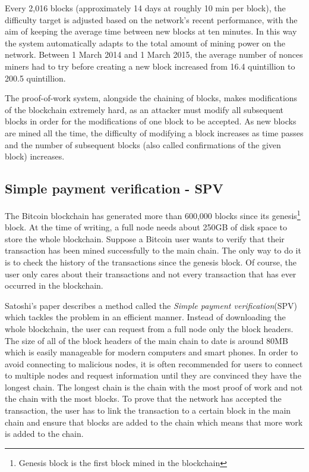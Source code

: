 Every 2,016 blocks (approximately 14 days at roughly 10 min per block), the
difficulty target is adjusted based on the network's recent performance, with
the aim of keeping the average time between new blocks at ten minutes. In this
way the system automatically adapts to the total amount of mining power on the
network. Between 1 March 2014 and 1 March 2015, the average number of
nonces miners had to try before creating a new block increased from 16.4
quintillion to 200.5 quintillion.

The proof-of-work system, alongside the chaining of blocks, makes modifications
of the blockchain extremely hard, as an attacker must modify all subsequent
blocks in order for the modifications of one block to be accepted. As new
blocks are mined all the time, the difficulty of modifying a block increases as
time passes and the number of subsequent blocks (also called confirmations of
the given block) increases.

\subsection{Simple payment verification - SPV}

The Bitcoin blockchain has generated more than 600,000 blocks since its
genesis\footnote{Genesis block is the first block mined in the blockchain}
block. At the time of writing, a full node needs about 250GB of disk space to
store the whole blockchain. Suppose a Bitcoin user wants to verify that their
transaction has been mined successfully to the main chain. The only way to do
it is to check the history of the transactions since the genesis block. Of
course, the user only cares about their transactions and not every transaction
that has ever occurred in the blockchain.

Satoshi's paper describes a method called the \textit {Simple payment
verification}(SPV) which tackles the problem in an efficient manner. Instead of
downloading the whole blockchain, the user can request from a full node only
the block headers. The size of all of the block headers of the main chain to
date is around 80MB which is easily manageable for modern computers and smart
phones. In order to avoid connecting to malicious nodes, it is often
recommended for users to connect to multiple nodes and request information
until they are convinced they have the longest chain. The longest chain is the
chain with the most proof of work and not the chain with the most blocks. To
prove that the network has accepted the transaction, the user has to link the
transaction to a certain block in the main chain and ensure that blocks are
added to the chain which means that more work is added to the chain.

